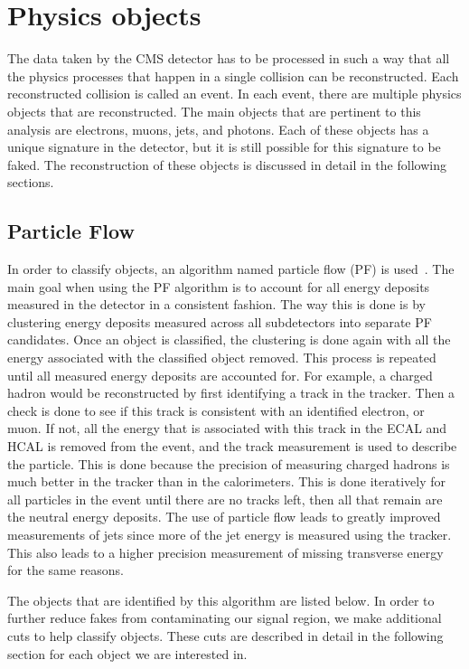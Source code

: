 \section{Physics objects}
The data taken by the CMS detector has to be processed in such a way that all the physics processes that happen in a single collision can be reconstructed.
Each reconstructed collision is called an event.
In each event, there are multiple physics objects that are reconstructed.
The main objects that are pertinent to this analysis are electrons, muons, jets, and photons.
Each of these objects has a unique signature in the detector, but it is still possible for this signature to be faked.
The reconstruction of these objects is discussed in detail in the following sections.

\subsection{Particle Flow}
\label{subs:particleflow}
In order to classify objects, an algorithm named particle flow (PF) is used~\cite{pfReco}. 
The main goal when using the PF algorithm is to account for all energy deposits measured in the detector in a consistent fashion.
The way this is done is by clustering energy deposits measured across all subdetectors into separate PF candidates.
Once an object is classified, the clustering is done again with all the energy associated with the classified object removed.
This process is repeated until all measured energy deposits are accounted for.
For example, a charged hadron would be reconstructed by first identifying a track in the tracker.
Then a check is done to see if this track is consistent with an identified electron, or muon.
If not, all the energy that is associated with this track in the ECAL and HCAL is removed from the event,
and the track measurement is used to describe the particle.
This is done because the precision of measuring charged hadrons is much better in the tracker than in the calorimeters.
This is done iteratively for all particles in the event until there are no tracks left,
then all that remain are the neutral energy deposits.
The use of particle flow leads to greatly improved measurements of jets since more of the jet energy is measured using the tracker.
This also leads to a higher precision measurement of missing transverse energy for the same reasons.

The objects that are identified by this algorithm are listed below.
In order to further reduce fakes from contaminating our signal region, we make additional cuts to help classify objects.
These cuts are described in detail in the following section for each object we are interested in.

